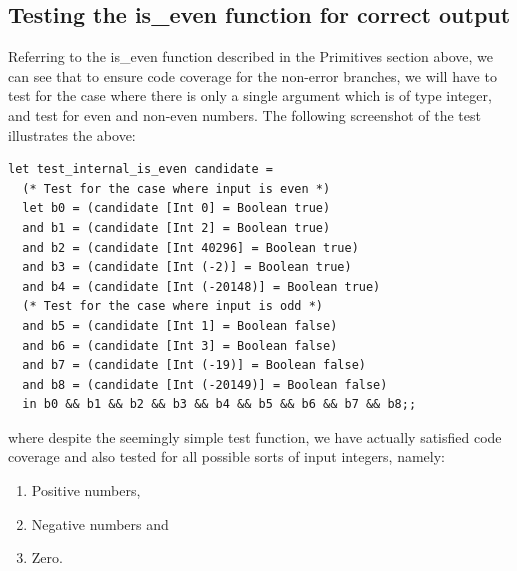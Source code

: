 \subsection{Testing the is\_even function for correct output}
Referring to the is\_even function described in the Primitives section above, we can see that to ensure code coverage for the non-error branches, we will have to test for the case where there is only a single argument which is 
of type integer, and test for even and non-even numbers. The following screenshot of the test illustrates the above:
\begin{scriptsize}
\begin{verbatim}
let test_internal_is_even candidate =
  (* Test for the case where input is even *)
  let b0 = (candidate [Int 0] = Boolean true)
  and b1 = (candidate [Int 2] = Boolean true)
  and b2 = (candidate [Int 40296] = Boolean true)
  and b3 = (candidate [Int (-2)] = Boolean true)
  and b4 = (candidate [Int (-20148)] = Boolean true)
  (* Test for the case where input is odd *)
  and b5 = (candidate [Int 1] = Boolean false)
  and b6 = (candidate [Int 3] = Boolean false)
  and b7 = (candidate [Int (-19)] = Boolean false)
  and b8 = (candidate [Int (-20149)] = Boolean false)
  in b0 && b1 && b2 && b3 && b4 && b5 && b6 && b7 && b8;;
\end{verbatim}
\end{scriptsize}
where despite the seemingly simple test function, we have actually satisfied code coverage and also tested for all possible sorts of input integers, namely:
\begin{enumerate}
   \item Positive numbers, 
   \item Negative numbers and
   \item Zero.
\end{enumerate}
